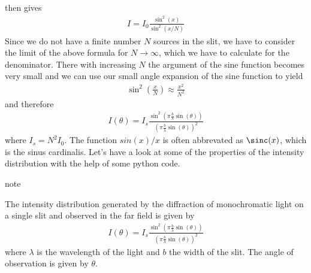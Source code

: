 \documentclass[letterpaper,10pt,english]{sphinxmanual}
\begin{document}
then gives
\begin{equation*}
\begin{split}I=I_0\frac{\sin^2(x)}{\sin^2(x/N)}\end{split}
\end{equation*}
Since we do not have a finite number \(N\) sources in the slit, we have to consider the limit of the above formula for \(N\rightarrow\infty\), which we have to calculate for the denominator. There with increasing \(N\) the argument of the sine function becomes very small and we can use our small angle expansion of the sine function to yield
\begin{equation*}
\begin{split}\sin^2\left (\frac{x}{N}\right) \approx \frac{x^2}{N^2}\end{split}
\end{equation*}
and therefore
\begin{equation*}
\begin{split}I(\theta)=I_s\frac{\sin^2\left (\pi \frac{b}{\lambda}\sin(\theta)\right)}{\left( \pi \frac{b}{\lambda}\sin(\theta)\right)^2}\end{split}
\end{equation*}
where \(I_s=N^2I_0\). The function \(sin(x)/x\) is often abbrevated as \(\sinc(x)\), which is the sinus cardinalis. Let’s have a look at some of the properties of the intensity distribution with the help of some python code.

\begin{sphinxadmonition}{note}{}\unskip
{}

The intensity distribution generated by the diffraction of monochromatic light on a single slit and observed in the far field is given by
\begin{equation*}
\begin{split}I(\theta)=I_s\frac{\sin^2\left (\pi \frac{b}{\lambda}\sin(\theta)\right)}{\left( \pi \frac{b}{\lambda}\sin(\theta)\right)^2}\end{split}
\end{equation*}
where \(\lambda\) is the wavelength of the light and \(b\) the width of the slit. The angle of observation is given by \(\theta\).
\end{sphinxadmonition}

\end{document}
